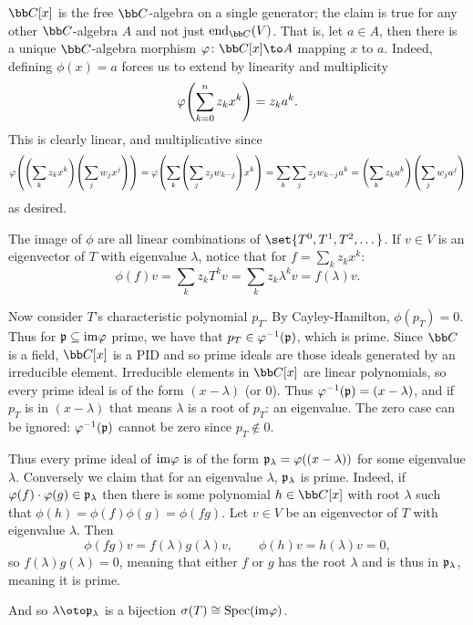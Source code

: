 \eprob

\benum
    \item $\bC[x]$ is the free $\bC$-algebra on a single generator; the claim is true for any other $\bC$-algebra $A$ and not just $\endo_\bC(V)$.
    That is, let $a\in A$, then there is a unique $\bC$-algebra morphism $\phi\colon\bC[x]\to A$ mapping $x$ to $a$.
    Indeed, defining $\phi(x)=a$ forces us to extend by linearity and multiplicity
    $$ \varphi\mathopen{}\mathclose{\left(\sum_{k=0}^nz_kx^k\right)} = z_ka^k . $$
    This is clearly linear, and multiplicative since
    $$ \varphi\mathopen{}\mathclose{\left(\mathopen{}\mathclose{\left(\sum_kz_kx^k\right)}\mathopen{}\mathclose{\left(\sum_jw_jx^j\right)}\right)} = \varphi\mathopen{}\mathclose{\left(\sum_k\mathopen{}\mathclose{\left(\sum_jz_jw_{k-j}\right)}x^k\right)} = \sum_k\sum_jz_jw_{k-j}a^k =
    \mathopen{}\mathclose{\left(\sum_kz_ka^k\right)}\mathopen{}\mathclose{\left(\sum_jw_ja^j\right)} $$
    as desired.

    \item The image of $\phi$ are all linear combinations of $\set{T^0,T^1,T^2,\dots}$.
    If $v\in V$ is an eigenvector of $T$ with eigenvalue $\lambda$, notice that for $f=\sum_kz_kx^k$:
    $$ \phi(f)v = \sum_kz_kT^kv = \sum_k z_k\lambda^k v = f(\lambda)v . $$

    Now consider $T$'s characteristic polynomial $p_T$.
    By Cayley-Hamilton, $\phi(p_T)=0$.
    Thus for ${{\frak p}}\subseteq{\rm im}\varphi$ prime, we have that $p_T\in\varphi^{-1}({{\frak p}})$, which is prime.
    Since $\bC$ is a field, $\bC[x]$ is a PID and so prime ideals are those ideals generated by an irreducible element.
    Irreducible elements in $\bC[x]$ are linear polynomials, so every prime ideal is of the form $(x-\lambda)$ (or $0$).
    Thus $\varphi^{-1}({{\frak p}})=(x-\lambda)$, and if $p_T$ is in $(x-\lambda)$ that means $\lambda$ is a root of $p_T$: an eigenvalue.
    The zero case can be ignored: $\varphi^{-1}({{\frak p}})$ cannot be zero since $p_T\notin0$.

    Thus every prime ideal of ${\rm im}\varphi$ is of the form ${{\frak p}}_\lambda=\varphi((x-\lambda))$ for some eigenvalue $\lambda$.
    Conversely we claim that for an eigenvalue $\lambda$, ${{\frak p}}_\lambda$ is prime.
    Indeed, if $\varphi(f)\cdot\varphi(g)\in{{\frak p}}_\lambda$ then there is some polynomial $h\in\bC[x]$ with root $\lambda$ such that $\phi(h)=\phi(f)\phi(g)=\phi(fg)$.
    Let $v\in V$ be an eigenvector of $T$ with eigenvalue $\lambda$.
    Then
    $$ \phi(fg)v = f(\lambda)g(\lambda)v,\qquad \phi(h)v = h(\lambda)v = 0 , $$
    so $f(\lambda)g(\lambda)=0$, meaning that either $f$ or $g$ has the root $\lambda$ and is thus in ${{\frak p}}_\lambda$, meaning it is prime.

    And so $\lambda\oto\p_\lambda$ is a bijection $\sigma(T)\cong{\rm Spec}({\rm im}\varphi)$.
\eenum

